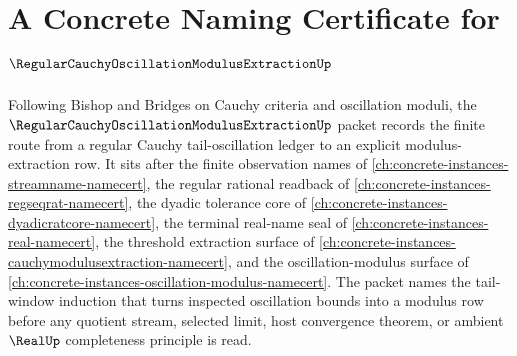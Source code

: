 \chapter{A Concrete Naming Certificate for $\RegularCauchyOscillationModulusExtractionUp$}
\label{ch:concrete-instances-regular-cauchy-oscillation-modulus-extraction-namecert}

Following Bishop and Bridges on Cauchy criteria and oscillation moduli, the $\RegularCauchyOscillationModulusExtractionUp$ packet records the finite route from a regular Cauchy tail-oscillation ledger to an explicit modulus-extraction row. It sits after the finite observation names of \autoref{ch:concrete-instances-streamname-namecert}, the regular rational readback of \autoref{ch:concrete-instances-regseqrat-namecert}, the dyadic tolerance core of \autoref{ch:concrete-instances-dyadicratcore-namecert}, the terminal real-name seal of \autoref{ch:concrete-instances-real-namecert}, the threshold extraction surface of \autoref{ch:concrete-instances-cauchymodulusextraction-namecert}, and the oscillation-modulus surface of \autoref{ch:concrete-instances-oscillation-modulus-namecert}. The packet names the tail-window induction that turns inspected oscillation bounds into a modulus row before any quotient stream, selected limit, host convergence theorem, or ambient $\RealUp$ completeness principle is read.

